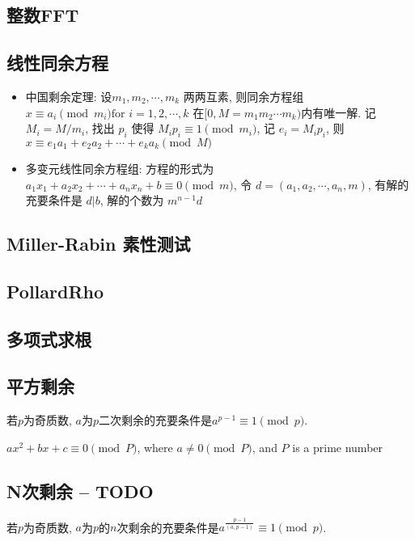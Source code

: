 \documentclass[landscape, twocolumn, 8pt, a4paper, twoside]{extarticle}
\begin{document}
  \subsection{整数FFT}
    

  \subsection{线性同余方程}
    \begin{itemize}
    \item 中国剩余定理:
      设$m_1, m_2, \cdots, m_k$ 两两互素, 则同余方程组 $x \equiv a_i \pmod{m_i} \textrm{for $i = 1, 2, \cdots, k$}$
      在$[0, M = m_1 m_2 \cdots m_k)$内有唯一解. 
      记 $M_i = M / m_i$,
      找出 $p_i$ 使得 $M_i p_i \equiv 1 \pmod{m_i}$,
      记 $e_i = M_i p_i$,
      则 $x \equiv e_1 a_1 + e_2 a_2 + \cdots + e_k a_k \pmod{M}$
    \item 多变元线性同余方程组:
      方程的形式为 $a_1 x_1 + a_2 x_2 + \cdots + a_n x_n + b \equiv 0 \pmod{m}$,
      令 $d = (a_1, a_2, \cdots, a_n, m)$,
      有解的充要条件是 $d | b$, 解的个数为 $m^{n - 1} d$
    \end{itemize}

  \subsection{Miller-Rabin 素性测试}
    
  
  \subsection{PollardRho}
    

  \subsection{多项式求根}
    
  
  \subsection{平方剩余}
    若$p$为奇质数, $a$为$p$二次剩余的充要条件是$a^{p - 1} \equiv 1 \pmod{p}$.

    $ax^2 + bx + c \equiv 0 \pmod{P}$, where $a \ne 0 \pmod{P}$, and $P$ is a prime number
    
  
  \subsection{N次剩余 -- TODO}
    若$p$为奇质数, $a$为$p$的$n$次剩余的充要条件是$a^{\frac{p - 1}{(a, p - 1)}} \equiv 1 \pmod{p}$.
  
\end{document}
